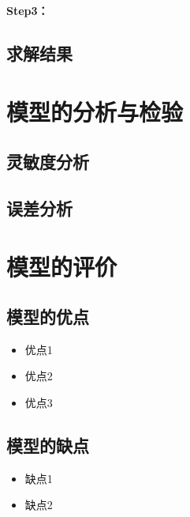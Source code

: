 \documentclass[withoutpreface,bwprint]{cumcmthesis}
\begin{document}
\textbf{Step3：} 

\subsection{求解结果}


\section{模型的分析与检验}

\subsection{灵敏度分析}

\subsection{误差分析}


\section{模型的评价}

\subsection{模型的优点}
\begin{itemize}[itemindent=2em]
\item 优点1
\item 优点2
\item 优点3
\end{itemize}

\subsection{模型的缺点}
\begin{itemize}[itemindent=2em]
\item 缺点1
\item 缺点2
\end{itemize}

\nocite{*}
\end{document}
